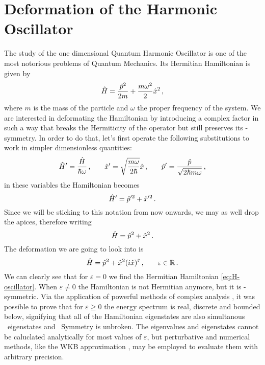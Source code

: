         \section{Deformation of the Harmonic Oscillator}\label{s:deformed-harmonic-oscillator}
            The study of the one dimensional Quantum Harmonic Oscillator is one of the most notorious problems of Quantum Mechanics. Its Hermitian Hamiltonian is given by
            \begin{equation}
                \hat{H} = \frac{\hat{p}^2}{2m} + \frac{m\omega^2}{2}\hat{x}^2\,\text{,}
            \end{equation}
            where $m$ is the mass of the particle and $\omega$ the proper frequency of the system. We are interested in deformating the Hamiltonian by introducing a complex factor in such a way that breaks the Hermiticity of the operator but still preserves its \PT-symmetry. In order to do that, let's first operate the following substitutions to work in simpler dimensionless quantities:
            \begin{equation}
                \hat{H}' = \frac{\hat{H}}{\hbar\omega}
                \,\text{,}\qquad
                \hat{x}' = \sqrt{\frac{m\omega}{2\hbar}}\hat{x}
                \,\text{,}\qquad
                \hat{p}' = \frac{\hat{p}}{\sqrt{2 \hbar m \omega}}
                \,\text{,}
            \end{equation}
            in these variables the Hamiltonian becomes
            \begin{equation*}
                \hat{H}' = \hat{p}'^2 + \hat{x}'^2
                \,\text{.}
            \end{equation*}
            Since we will be sticking to this notation from now onwards, we may as well drop the apices, therefore writing
            \begin{equation}
                \label{eq:H-oscillator}
                \hat{H} = \hat{p}^2 + \hat{x}^2
                \,\text{.}
            \end{equation}
            The deformation we are going to look into is
            \begin{equation}
                \hH = \hp^2 + \hx^2\pqty{i\hx}^\varepsilon
                \mycomma\qquad
                \varepsilon \in \bbR
                \myperiod
            \end{equation}
            We can clearly see that for $\varepsilon = 0$ we find the Hermitian Hamiltonian \eqref{eq:H-oscillator}. When $\varepsilon \neq 0$ the Hamiltonian is not Hermitian anymore, but it is \PT-symmetric. Via the application of powerful methods of complex analysis \cite{bender2024,Bender1998}, it was possible to prove that for $\varepsilon \geq 0$ the energy spectrum is real, discrete and bounded below, signifying that all of the Hamiltonian eigenstates are also simultanous \hPT\ eigenstates and \PT\ Symmetry is unbroken. The eigenvalues and eigenstates cannot be caluclated analytically for most values of $\varepsilon$, but perturbative and numerical methods, like the WKB approximation \cite{Bender2007}, may be employed to evaluate them with arbitrary precision.

